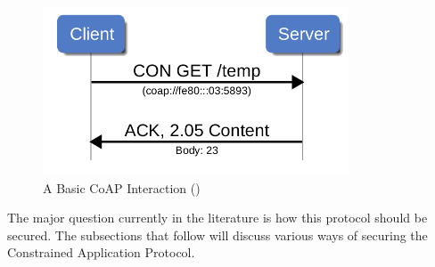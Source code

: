 \documentclass[letterpaper, 12pt]{article}
\begin{document}
\begin{flushleft}
\begin{figure}[H]
	\includegraphics[width=\linewidth,height=5cm,keepaspectratio]{figure8.png}
	\caption{A Basic CoAP Interaction (\cite{Capossele})}
	\label{fig:arch}
\end{figure}

The major question currently in the literature is how this protocol should be secured. The subsections that follow will discuss various ways of securing
the Constrained Application Protocol. 


\end{flushleft}
\end{document}
